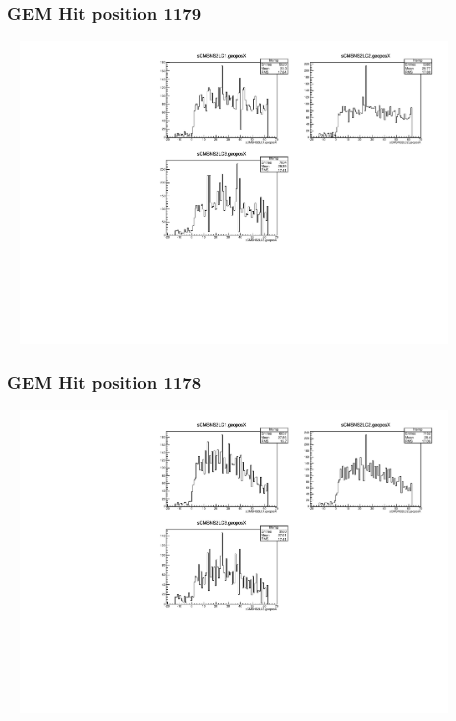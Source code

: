 \documentclass[slidestop,compress,mathserif]{beamer}
\begin{document}
\begin{frame}\frametitle{GEM Hit position 1179}
	 \includegraphics[width=12cm,height=8cm]{GEM_Hit_position_1179.pdf}
\end{frame}
\begin{frame}\frametitle{GEM Hit position 1178}
	 \includegraphics[width=12cm,height=8cm]{GEM_Hit_position_1178.pdf}
\end{frame}
\end{document}
